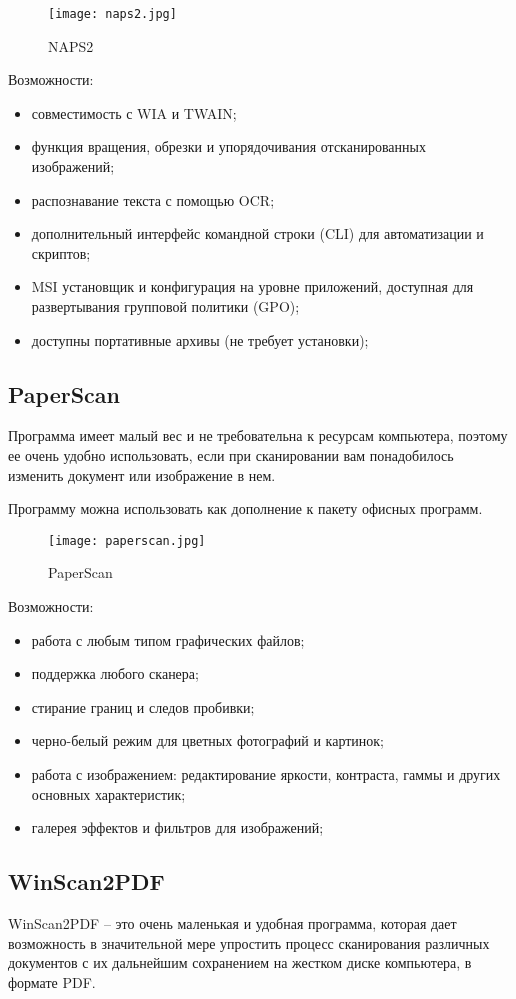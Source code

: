 \begin{figure}[h!]
	\centering
	\texttt{[image: naps2.jpg]}
	\caption{NAPS2}
\end{figure}

Возможности:
\begin{itemize}
	\item совместимость с WIA и TWAIN;
	\item функция вращения, обрезки и упорядочивания отсканированных изображений;
	\item распознавание текста с помощью OCR;
	\item дополнительный интерфейс командной строки (CLI) для автоматизации и скриптов;
	\item MSI установщик и конфигурация на уровне приложений, доступная для развертывания групповой политики (GPO);
	\item доступны портативные архивы (не требует установки);
\end{itemize}

\subsection{PaperScan}
Программа имеет малый вес и не требовательна к ресурсам компьютера, поэтому ее очень удобно использовать, если при сканировании вам понадобилось изменить документ или изображение в нем.

Программу можна использовать как дополнение к пакету офисных программ.

\begin{figure}[h!]
	\centering
	\texttt{[image: paperscan.jpg]}
	\caption{PaperScan}
\end{figure}

Возможности:
\begin{itemize}
	\item работа с любым типом графических файлов;
	\item поддержка любого сканера;
	\item стирание границ и следов пробивки;
	\item черно-белый режим для цветных фотографий и картинок;
	\item работа с изображением: редактирование яркости, контраста, гаммы и других основных характеристик;
	\item галерея эффектов и фильтров для изображений;
\end{itemize}

\subsection{WinScan2PDF}
WinScan2PDF – это очень маленькая и удобная программа, которая дает возможность в значительной мере упростить процесс сканирования различных документов с их дальнейшим сохранением на жестком диске компьютера, в формате PDF.

